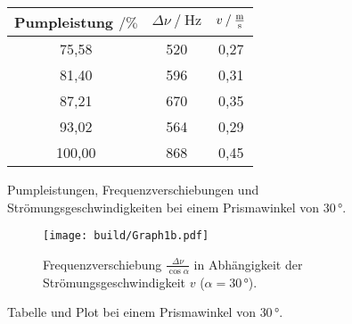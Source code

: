 \begin{figure}
    \begin{subtable}{0.43\textwidth}
        \centering
       \begin{tabular}{c c c}
        \toprule 
        {Pumpleistung $\mathbin{/}\%$} & {$\Delta \nu \mathbin{/} \unit{\hertz}$} & {$v \mathbin{/} \unit{\frac{\meter}{\second}}$}  \\
        \midrule 
                 75,58    &     520    &    0,27 \\
                 81,40    &     596    &    0,31 \\
                 87,21    &     670    &    0,35 \\
                 93,02    &     564    &    0,29 \\
                100,00    &     868    &    0,45 \\
        \bottomrule
       \end{tabular}
       \caption{Pumpleistungen, Frequenzverschiebungen und Strömungsgeschwindigkeiten bei einem Prismawinkel von $30 \,°$.}
        \label{tab:1winkel2}  
    \end{subtable}
    \begin{subfigure}{0.57\textwidth} 
        \centering
        \texttt{[image: build/Graph1b.pdf]} %
        \caption{Frequenzverschiebung $\frac{\Delta \nu}{\cos\alpha}$ in Abhängigkeit der Strömungsgeschwindigkeit $v$ ($\alpha = 30 \,°$).}  
        \label{fig:graph1b}
        \qquad
    \end{subfigure}
    \caption{Tabelle und Plot bei einem Prismawinkel von $30 \,°$.} 
\end{figure}  

